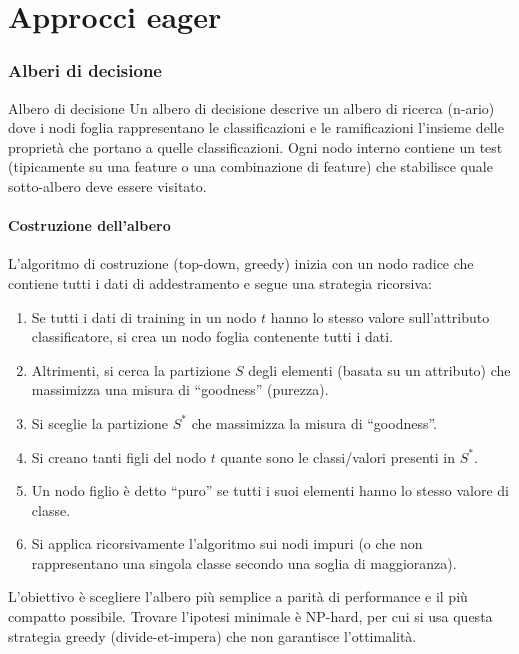 \section{Approcci eager}
\subsubsection{Alberi di decisione}

\begin{definizione}{Albero di decisione}
Un albero di decisione descrive un albero di ricerca (n-ario) dove i nodi
foglia rappresentano le classificazioni e le ramificazioni l'insieme delle
proprietà che portano a quelle classificazioni.
Ogni nodo interno contiene un test (tipicamente su una feature o una
combinazione di feature) che stabilisce quale sotto-albero deve essere
visitato.
\end{definizione}

\paragraph{Costruzione dell'albero}
L'algoritmo di costruzione (top-down, greedy) inizia con un nodo radice che
contiene tutti i dati di addestramento e segue una strategia ricorsiva:
\begin{enumerate}
    \item Se tutti i dati di training in un nodo $t$ hanno lo stesso valore
    sull'attributo classificatore, si crea un nodo foglia contenente
    tutti i dati.
    \item Altrimenti, si cerca la partizione $S$ degli elementi (basata su
    un attributo) che massimizza una misura di ``goodness'' (purezza).
    \item Si sceglie la partizione $S^*$ che massimizza la misura di
    ``goodness''.
    \item Si creano tanti figli del nodo $t$ quante sono le classi/valori
    presenti in $S^*$.
    \item Un nodo figlio è detto ``puro'' se tutti i suoi elementi hanno lo
    stesso valore di classe.
    \item Si applica ricorsivamente l'algoritmo sui nodi impuri (o che non
    rappresentano una singola classe secondo una soglia di maggioranza).
\end{enumerate}

L'obiettivo è scegliere l'albero più semplice a parità di performance e il più
compatto possibile. Trovare l'ipotesi minimale è NP-hard, per cui si usa
questa strategia greedy (divide-et-impera) che non garantisce l'ottimalità.


